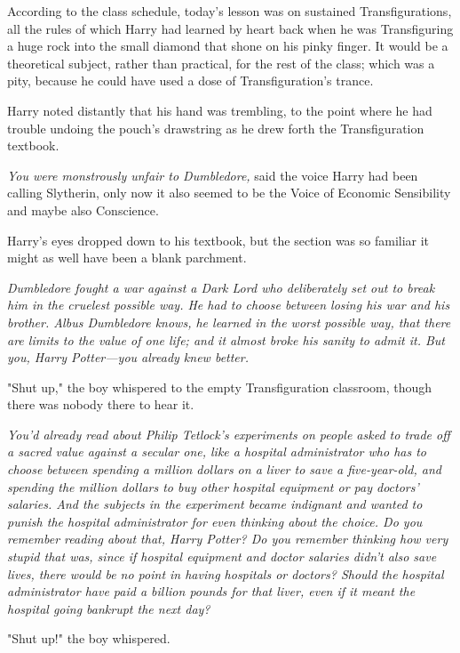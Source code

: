 According to the class schedule, today’s lesson was on sustained
Transfigurations, all the rules of which Harry had learned by heart back when
he was Transfiguring a huge rock into the small diamond that shone on his pinky
finger. It would be a theoretical subject, rather than practical, for the rest
of the class; which was a pity, because he could have used a dose of
Transfiguration’s trance.

Harry noted distantly that his hand was trembling, to the point where he had
trouble undoing the pouch’s drawstring as he drew forth the Transfiguration
textbook.

\emph{You were monstrously unfair to Dumbledore,} said the voice Harry had been
calling Slytherin, only now it also seemed to be the Voice of Economic
Sensibility and maybe also Conscience.

Harry’s eyes dropped down to his textbook, but the section was so familiar it
might as well have been a blank parchment.

\emph{Dumbledore fought a war against a Dark Lord who deliberately set out to
break him in the cruelest possible way. He had to choose between losing his war
and his brother. Albus Dumbledore knows, he learned in the worst possible way,
that there are limits to the value of one life; and it almost broke his sanity
to admit it. But you, Harry Potter—\emph{you} already knew better.}

"Shut up," the boy whispered to the empty Transfiguration classroom, though
there was nobody there to hear it.

\emph{You’d already read about Philip Tetlock’s experiments on people asked to
trade off a sacred value against a secular one, like a hospital administrator
who has to choose between spending a million dollars on a liver to save a
five-year-old, and spending the million dollars to buy other hospital equipment
or pay doctors’ salaries. And the subjects in the experiment became indignant
and wanted to punish the hospital administrator for even thinking about the
choice. Do you remember reading about that, Harry Potter? Do you remember
thinking how very stupid that was, since if hospital equipment and doctor
salaries didn’t also save lives, there would be no point in having hospitals or
doctors? Should the hospital administrator have paid a billion pounds for that
liver, even if it meant the hospital going bankrupt the next day?}

"Shut up!" the boy whispered.

